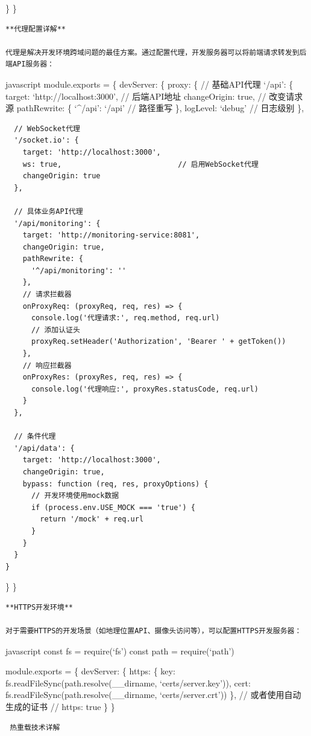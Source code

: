 {{\} \}

\begin{lstlisting}
**代理配置详解**

代理是解决开发环境跨域问题的最佳方案。通过配置代理，开发服务器可以将前端请求转发到后端API服务器：
\end{lstlisting}

javascript module.exports = \{ devServer: \{ proxy: \{ // 基础API代理 `/api': \{ target: `http://localhost:3000', // 后端API地址 changeOrigin: true, // 改变请求源 pathRewrite: \{ `\^{}/api': `/api' // 路径重写 \}, logLevel: `debug' // 日志级别 \},

\begin{verbatim}
  // WebSocket代理
  '/socket.io': {
    target: 'http://localhost:3000',
    ws: true,                           // 启用WebSocket代理
    changeOrigin: true
  },
  
  // 具体业务API代理
  '/api/monitoring': {
    target: 'http://monitoring-service:8081',
    changeOrigin: true,
    pathRewrite: {
      '^/api/monitoring': ''
    },
    // 请求拦截器
    onProxyReq: (proxyReq, req, res) => {
      console.log('代理请求:', req.method, req.url)
      // 添加认证头
      proxyReq.setHeader('Authorization', 'Bearer ' + getToken())
    },
    // 响应拦截器
    onProxyRes: (proxyRes, req, res) => {
      console.log('代理响应:', proxyRes.statusCode, req.url)
    }
  },
  
  // 条件代理
  '/api/data': {
    target: 'http://localhost:3000',
    changeOrigin: true,
    bypass: function (req, res, proxyOptions) {
      // 开发环境使用mock数据
      if (process.env.USE_MOCK === 'true') {
        return '/mock' + req.url
      }
    }
  }
}
\end{verbatim}

\} \}

\begin{lstlisting}
**HTTPS开发环境**

对于需要HTTPS的开发场景（如地理位置API、摄像头访问等），可以配置HTTPS开发服务器：
\end{lstlisting}

javascript const fs = require(`fs') const path = require(`path')

module.exports = \{ devServer: \{ https: \{ key: fs.readFileSync(path.resolve(\_\_dirname, `certs/server.key')), cert: fs.readFileSync(path.resolve(\_\_dirname, `certs/server.crt')) \}, // 或者使用自动生成的证书 // https: true \} \}

\begin{lstlisting}
 热重载技术详解


\end{lstlisting}}}
